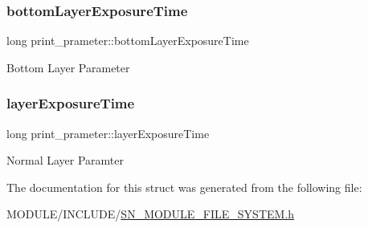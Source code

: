 \subsubsection{\texorpdfstring{bottom\+Layer\+Exposure\+Time}{bottomLayerExposureTime}}
{\footnotesize\ttfamily long print\+\_\+prameter\+::bottom\+Layer\+Exposure\+Time}

Bottom Layer Parameter \mbox{\label{structprint__prameter_a132ea30d7e46206117d917db4e2d1bcf}} 
\subsubsection{\texorpdfstring{layer\+Exposure\+Time}{layerExposureTime}}
{\footnotesize\ttfamily long print\+\_\+prameter\+::layer\+Exposure\+Time}

Normal Layer Paramter 

The documentation for this struct was generated from the following file\+:\begin{DoxyCompactItemize}
\item 
M\+O\+D\+U\+L\+E/\+I\+N\+C\+L\+U\+D\+E/\hyperlink{SN__MODULE__FILE__SYSTEM_8h}{S\+N\+\_\+\+M\+O\+D\+U\+L\+E\+\_\+\+F\+I\+L\+E\+\_\+\+S\+Y\+S\+T\+E\+M.\+h}\end{DoxyCompactItemize}
